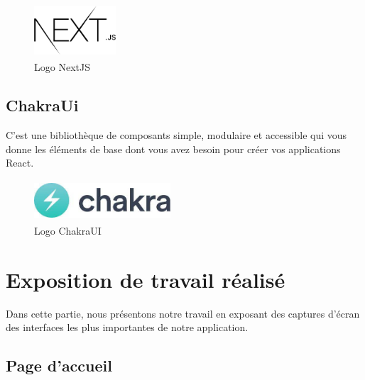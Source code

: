 \documentclass[12pt]{report}
\begin{document}
\begin{figure}[h]
\centering
    \includegraphics[width = 1.2in, height = 0.8in]{../images/nextjs.png}
\caption{Logo NextJS}
\end{figure}

\subsection{ChakraUi}
\vspace{0.1in}
\hspace*{0.16in}
C’est une bibliothèque de composants simple, modulaire et accessible qui vous donne les éléments de base dont vous avez besoin pour créer vos applications React.

\vspace{0.1in}

\begin{figure}[h]
\centering
    \includegraphics[width = 2in, height = 0.6in]{../images/chakraUI.jpg}
\caption{Logo ChakraUI}
\end{figure}

\section{Exposition de travail réalisé}
\vspace{0.1in}
\hspace*{0.16in}
Dans cette partie, nous présentons notre travail en exposant des captures d’écran des interfaces les plus importantes de notre application.

\newpage

\subsection{Page d'accueil}
\end{document}
